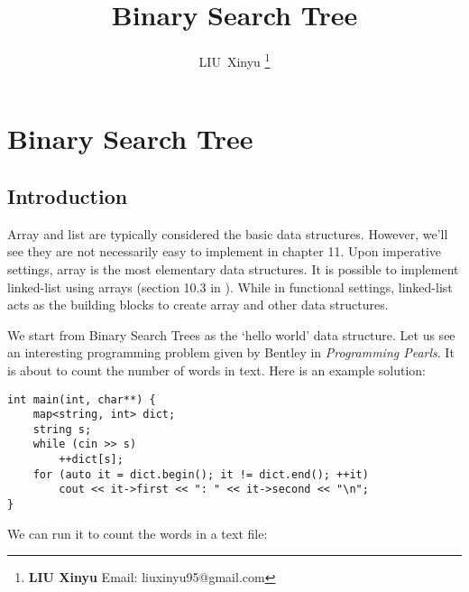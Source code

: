 \documentclass[b5paper]{article}
\begin{document}
\title{Binary Search Tree}

\author{LIU~Xinyu
\thanks{{\bfseries LIU Xinyu } \newline
  Email: liuxinyu95@gmail.com \newline}
  }

\maketitle
\fi


\ifx\wholebook\relax
\chapter{Binary Search Tree}
\fi

\section{Introduction}
\label{introduction} 

Array and list are typically considered the basic data structures. However, we'll see they are not necessarily easy to implement in chapter 11. Upon imperative settings, array is the most elementary data structures. It is possible to implement linked-list using arrays (section  10.3 in \cite{CLRS}). While in functional settings, linked-list acts as the building blocks to create array and other data structures.

We start from Binary Search Trees as the `hello world' data structure. Let us see an interesting programming problem given by Bentley in {\em Programming Pearls}\cite{Bentley}. It is about to count the number of words in text. Here is an example solution:

\lstset{language=C++, frame=single}
\begin{lstlisting}
int main(int, char**) {
    map<string, int> dict;
    string s;
    while (cin >> s)
        ++dict[s];
    for (auto it = dict.begin(); it != dict.end(); ++it)
        cout << it->first << ": " << it->second << "\n";
}
\end{lstlisting}

We can run it to count the words in a text file:
\end{document}
